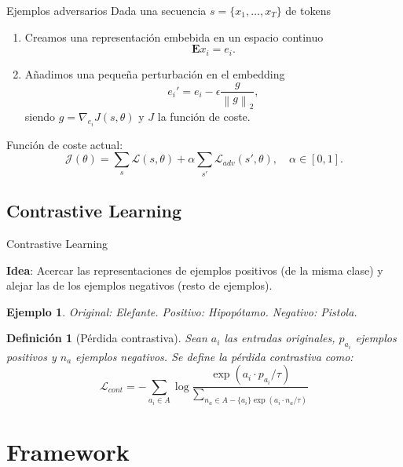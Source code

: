 \documentclass[aspectratio=169]{beamer}
\newcommand{\norm}[1]{\left\lVert#1\right\rVert}
\newtheorem{defi}{Definición}
\newtheorem{ex}{Ejemplo}
\begin{document}
  \begin{frame}{Ejemplos adversarios}
    Dada una secuencia \(s = \{x_1,\dots,x_T\}\) de tokens
    \begin{enumerate}
      \item Creamos una representación embebida en un espacio continuo 
      \[
        \mathbf{E}x_i = e_i.  
      \]
      \item Añadimos una pequeña perturbación en el embedding
      \[
      e_i' = e_i - \epsilon \frac{g}{\norm{g}_2},   
      \]
      siendo \(g = \nabla_{e_i}J(s,\theta)\) y \(J\) la función de coste.
    \end{enumerate}

    Función de coste actual:
    \[
    \mathcal J(\theta) = \sum_s \mathcal L(s,\theta) + \alpha \sum_{s'} \mathcal L_{adv} (s',\theta), \quad \alpha \in [0,1].  
    \]
  \end{frame}

  \subsection{Contrastive Learning}

  \begin{frame}{Contrastive Learning}
    
      {\color{Maroon}\textbf{Idea}:} Acercar las representaciones de ejemplos positivos (de la misma clase) y alejar las de los ejemplos negativos (resto de ejemplos).
    

    \begin{ex}
      Original: Elefante. Positivo: Hipopótamo. Negativo: Pistola.
    \end{ex}

    \begin{defi}[Pérdida contrastiva]
      Sean \(a_i\) las entradas originales, \(p_{a_i}\) ejemplos positivos y \(n_{a}\) ejemplos negativos. Se define la pérdida contrastiva como:
      \[
      \mathcal L_{cont} = - \sum_{a_i \in A} \log \frac{\exp(a_i \cdot p_{a_i}/\tau)}{\sum_{n_a \in A - \{a_i\} \exp(a_i \cdot n_a / \tau)}}  
      \]
    \end{defi}
  \end{frame}


  \section{Framework}
\end{document}
